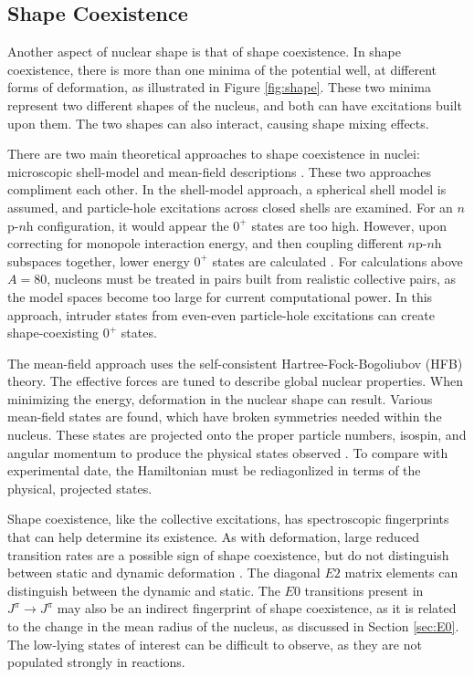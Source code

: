 \subsection{Shape Coexistence}

Another aspect of nuclear shape is that of shape coexistence. In shape coexistence, there is more than one minima of the potential well, at different forms of deformation, as illustrated in Figure \ref{fig:shape}. These two minima represent two different shapes of the nucleus, and both can have excitations built upon them. The two shapes can also interact, causing shape mixing effects. 



There are two main theoretical approaches to shape coexistence in nuclei: microscopic shell-model and mean-field descriptions \citep{heyde11:_shape_coexist}. These two approaches compliment each other. In the shell-model approach, a spherical shell model is assumed, and particle-hole excitations across closed shells are examined. For an $n$p-$n$h configuration, it would appear the $0^+$ states are too high. However, upon correcting for monopole interaction energy, and then coupling different $n$p-$n$h subspaces together, lower energy $0^+$ states are calculated \citep{caurier07:_shape_coexist}. For calculations above $A=80$, nucleons must be treated in pairs built from realistic collective pairs, as the model spaces become too large for current computational power\citep{heyde11:_shape_coexist}. In this approach, intruder states from even-even particle-hole excitations can create shape-coexisting $0^+$ states.

The mean-field approach uses the self-consistent Hartree-Fock-Bogoliubov (HFB) theory. The effective forces are tuned to describe global nuclear properties. When minimizing the energy, deformation in the nuclear shape can result. Various mean-field states are found, which have broken symmetries needed within the nucleus. These states are projected onto the proper particle numbers, isospin, and angular momentum to produce the physical states observed \citep{heyde11:_shape_coexist}. To compare with experimental date, the Hamiltonian must be rediagonlized in terms of the physical, projected states.

Shape coexistence, like the collective excitations, has spectroscopic fingerprints that can help determine its existence. As with deformation, large reduced transition rates are a possible sign of shape coexistence, but do not distinguish between static and dynamic deformation \citep{heyde11:_shape_coexist}. The diagonal $E2$ matrix elements can distinguish between the dynamic and static. The $E0$ transitions present in $J^{\pi}\rightarrow J^{\pi}$ may also be an indirect fingerprint of shape coexistence, as it is related to the change in the mean radius of the nucleus, as discussed in Section \ref{sec:E0}\citep{wood99:_e0}. The low-lying states of interest can be difficult to observe, as they are not populated strongly in reactions.

